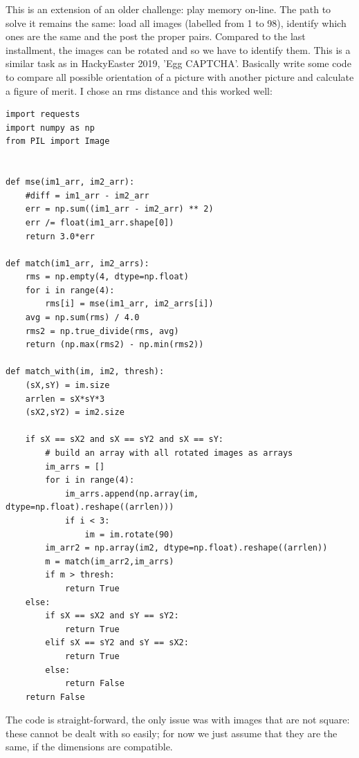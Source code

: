 \documentclass[english,a4paper,nols,noindent]{tufte-handout}
\begin{document}
\noindent This is an extension of an older challenge: play memory on-line.  The
path to solve it remains the same: load all images (labelled from 1 to 98),
identify which ones are the same and the post the proper pairs.  Compared to
the last installment, the images can be rotated and so we have to identify
them.  This is a similar task as in HackyEaster 2019, 'Egg CAPTCHA'.  Basically
write some code to compare all possible orientation of a picture with another
picture and calculate a figure of merit.  I chose an rms distance and this
worked well:

\begin{verbatim}
import requests
import numpy as np
from PIL import Image


def mse(im1_arr, im2_arr):
    #diff = im1_arr - im2_arr
    err = np.sum((im1_arr - im2_arr) ** 2)
    err /= float(im1_arr.shape[0])
    return 3.0*err

def match(im1_arr, im2_arrs):
    rms = np.empty(4, dtype=np.float)
    for i in range(4):
        rms[i] = mse(im1_arr, im2_arrs[i])
    avg = np.sum(rms) / 4.0
    rms2 = np.true_divide(rms, avg)
    return (np.max(rms2) - np.min(rms2))

def match_with(im, im2, thresh):
    (sX,sY) = im.size
    arrlen = sX*sY*3
    (sX2,sY2) = im2.size

    if sX == sX2 and sX == sY2 and sX == sY:
        # build an array with all rotated images as arrays
        im_arrs = []
        for i in range(4):
            im_arrs.append(np.array(im, dtype=np.float).reshape((arrlen)))
            if i < 3:
                im = im.rotate(90)
        im_arr2 = np.array(im2, dtype=np.float).reshape((arrlen))
        m = match(im_arr2,im_arrs)
        if m > thresh:
            return True
    else:
        if sX == sX2 and sY == sY2:
            return True
        elif sX == sY2 and sY == sX2:
            return True
        else:
            return False
    return False
\end{verbatim}

The code is straight-forward, the only issue was with images that are not
square: these cannot be dealt with so easily; for now we just assume that they
are the same, if the dimensions are compatible.
\end{document}
